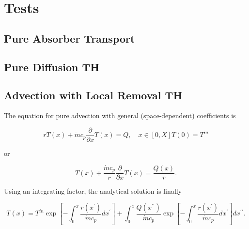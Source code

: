 \documentclass{proposal}
\newcommand{\ddx}{\ensuremath{\frac{\partial}{\partial x}}}
\newcommand{\p}{\ensuremath{^\prime}}
\begin{document}
\section{Tests}

\subsection{Pure Absorber Transport}

\subsection{Pure Diffusion TH}

\subsection{Advection with Local Removal TH}

The equation for pure advection with general (space-dependent) coefficients is

\begin{subequations}
    \begin{equation}
        rT(x) + \dot{m}c_p \ddx T(x) = Q, \quad x\in[0, X]
    \end{equation}
    \begin{equation}
        T(0) = T^{in}
    \end{equation}
\end{subequations}

or

\begin{equation}
    T(x) + \frac{\dot{m}c_p}{r}\ddx T(x) = \frac{Q(x)}{r}.
\end{equation}

Using an integrating factor, the analytical solution is finally

\begin{equation}
    T(x) = T^{in}\exp\left[-\int_0^x \frac{r(x\p)}{\dot{m}c_p}dx\p \right] + \int_0^x \frac{Q(x^{\prime\prime})}{\dot{m}c_p}\exp \left[-\int_0^x \frac{r(x\p)}{\dot{m}c_p}dx\p\right] dx^{\prime\prime}.
\end{equation}









\clearpage


\end{document}
